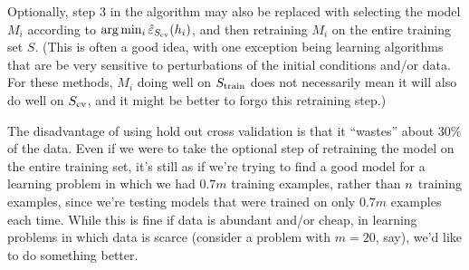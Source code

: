 \documentclass{article}
\begin{document}
Optionally, step 3 in the algorithm may also be replaced with selecting the model 
$M_i$ according to $\arg \min_i \hat\varepsilon_{{S_{\rm cv}}}(h_i)$, and then retraining
$M_i$ on the entire training set $S$.  (This is often a good idea,
with one exception being learning algorithms that are be very sensitive to 
perturbations of the initial conditions and/or data.  
For these methods, $M_i$ doing well on $S_{\rm train}$ does not necessarily 
mean it will also do well on ${S_{\rm cv}}$, and it might be better to forgo 
this retraining step.) 

The disadvantage of using hold out cross validation is that it ``wastes'' about 30\% of the data. 
Even if we were to take the optional step of retraining the model on the 
entire training set, it's still as if we're trying to find a good model for
a learning problem in which we had $0.7m$ training examples, rather than ${n}$
training examples, since we're testing models that were trained on only $0.7m$
examples each time.  While this is fine if data is abundant and/or cheap,
in learning problems in which data is scarce (consider a problem with $m=20$, say), 
we'd like to do something better.
\end{document}
